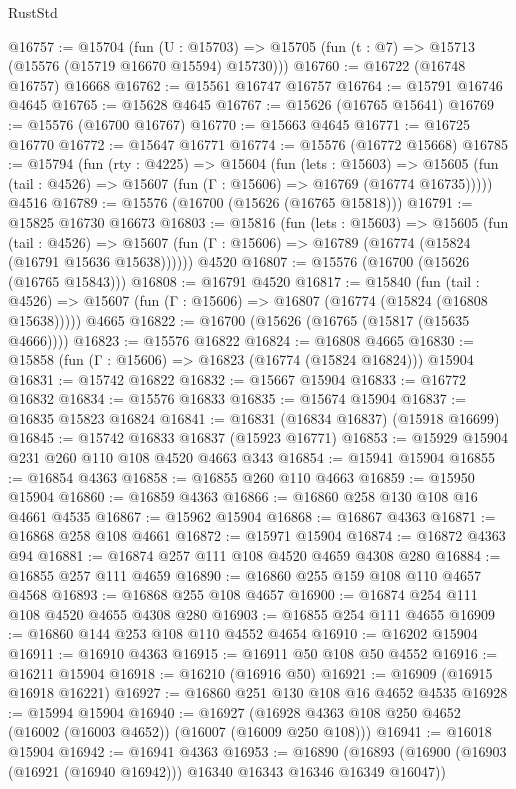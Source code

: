 \begin{lexlean}{RustStd}
\begin{coremodule}
@16757 := @15704
    (fun (U : @15703) => @15705 (fun (t : @7) => @15713 (@15576 (@15719 @16670 @15594) @15730)))
@16760 := @16722 (@16748 @16757) @16668
@16762 := @15561 @16747 @16757
@16764 := @15791 @16746 @4645
@16765 := @15628 @4645
@16767 := @15626 (@16765 @15641)
@16769 := @15576 (@16700 @16767)
@16770 := @15663 @4645
@16771 := @16725 @16770
@16772 := @15647 @16771
@16774 := @15576 (@16772 @15668)
@16785 := @15794
    (fun (rty : @4225) =>
    @15604
      (fun (lets : @15603) =>
      @15605 (fun (tail : @4526) => @15607 (fun (Γ : @15606) => @16769 (@16774 @16735)))))
    @4516
@16789 := @15576 (@16700 (@15626 (@16765 @15818)))
@16791 := @15825 @16730 @16673
@16803 := @15816
    (fun (lets : @15603) =>
    @15605
      (fun (tail : @4526) =>
      @15607 (fun (Γ : @15606) => @16789 (@16774 (@15824 (@16791 @15636 @15638))))))
    @4520
@16807 := @15576 (@16700 (@15626 (@16765 @15843)))
@16808 := @16791 @4520
@16817 := @15840
    (fun (tail : @4526) => @15607 (fun (Γ : @15606) => @16807 (@16774 (@15824 (@16808 @15638)))))
    @4665
@16822 := @16700 (@15626 (@16765 (@15817 (@15635 @4666))))
@16823 := @15576 @16822
@16824 := @16808 @4665
@16830 := @15858 (fun (Γ : @15606) => @16823 (@16774 (@15824 @16824))) @15904
@16831 := @15742 @16822
@16832 := @15667 @15904
@16833 := @16772 @16832
@16834 := @15576 @16833
@16835 := @15674 @15904
@16837 := @16835 @15823 @16824
@16841 := @16831 (@16834 @16837) (@15918 @16699)
@16845 := @15742 @16833 @16837 (@15923 @16771)
@16853 := @15929 @15904 @231 @260 @110 @108 @4520 @4663 @343
@16854 := @15941 @15904
@16855 := @16854 @4363
@16858 := @16855 @260 @110 @4663
@16859 := @15950 @15904
@16860 := @16859 @4363
@16866 := @16860 @258 @130 @108 @16 @4661 @4535
@16867 := @15962 @15904
@16868 := @16867 @4363
@16871 := @16868 @258 @108 @4661
@16872 := @15971 @15904
@16874 := @16872 @4363 @94
@16881 := @16874 @257 @111 @108 @4520 @4659 @4308 @280
@16884 := @16855 @257 @111 @4659
@16890 := @16860 @255 @159 @108 @110 @4657 @4568
@16893 := @16868 @255 @108 @4657
@16900 := @16874 @254 @111 @108 @4520 @4655 @4308 @280
@16903 := @16855 @254 @111 @4655
@16909 := @16860 @144 @253 @108 @110 @4552 @4654
@16910 := @16202 @15904
@16911 := @16910 @4363
@16915 := @16911 @50 @108 @50 @4552
@16916 := @16211 @15904
@16918 := @16210 (@16916 @50)
@16921 := @16909 (@16915 @16918 @16221)
@16927 := @16860 @251 @130 @108 @16 @4652 @4535
@16928 := @15994 @15904
@16940 := @16927 (@16928 @4363 @108 @250 @4652 (@16002 (@16003 @4652)) (@16007 (@16009 @250 @108)))
@16941 := @16018 @15904
@16942 := @16941 @4363
@16953 := @16890
    (@16893 (@16900 (@16903 (@16921 (@16940 @16942))) @16340 @16343 @16346 @16349 @16047))

\end{coremodule}
\end{lexlean}
